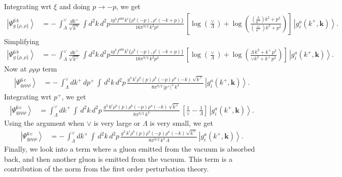 \documentclass[aps,prd,amsmath,amssymb,nofootinbib]{revtex4-2}
\numberwithin{equation}{section}
\begin{document}
Integrating wrt $\xi$ and doing $p\rightarrow -p$, we get
\begin{align}
    \left|\Psi_{g\,\{\rho,\rho\}}^{6\, b}\right\rangle & =-\,\int_{\Lambda}^{\vee} \frac{dk^{+}}{\sqrt{k^{+}}}\, \int d^{2}k \, d^{2}p \frac{ig^{3}f^{abc}k^{i}\{\rho^{b}(-p),\rho^{c}(-k+p)\}}{16\pi^{9/2}\,k^{2}p^{2}}\,\left[\log{\left(\frac{\vee}{\Lambda}\right)}+\log{\left(\frac{\left(\frac{\Lambda}{k^{+}}\right) k^{2}+p^{2}}{\left(\frac{\vee}{k^{+}} \right)k^{2}+p^{2}}\right)}\right]\,\left|g_{i}^{a}(k^{+},\mathbf{k})\right\rangle.
\end{align}
Simplifying
\begin{align}\label{tworhoafter}
    \left|\Psi_{g\,\{\rho,\rho\}}^{6\, b}\right\rangle & =-\,\int_{\Lambda}^{\vee} \frac{dk^{+}}{\sqrt{k^{+}}}\, \int d^{2}k \, d^{2}p \frac{ig^{3}f^{abc}k^{i}\{\rho^{b}(-p),\rho^{c}(-k+p)\}}{16\pi^{9/2}\,k^{2}p^{2}}\,\left[\log{\left(\frac{\vee}{\Lambda}\right)}+\log{\left(\frac{\Lambda\, k^{2} + k^{+}\,p^{2}}{\vee k^{2}+k^{+}\,p^{2}}\right)}\right]\,\left|g_{i}^{a}(k^{+},\mathbf{k})\right\rangle.
\end{align}
Now at $\rho\rho\rho$ term
\begin{align}
    \left|\Psi_{g\rho\rho\rho}^{6\, c}\right\rangle & = -\, \int_{\Lambda}^{\vee} dk^{+}\, dp^{+}\, \int\, d^{2}k\, d^{2}p\, \frac{g^{3}\, k^{i}\rho^{b}(p)\rho^{b}(-p)\rho^{a}(-k)\,\sqrt{k^{+}}}{8\pi^{9/2}\,|p^{+}|^{2}\,k^{4}}\,\left|g_{i}^{a}(k^{+},\mathbf{k})\right\rangle. 
\end{align}
Integrating wrt $p^{+}$, we get
\begin{align}
    \left|\Psi_{g\rho\rho\rho}^{6\, c}\right\rangle & = \int_{\Lambda}^{\vee} dk^{+}\, \int\, d^{2}k\, d^{2}p\, \frac{g^{3}\, k^{i}\rho^{b}(p)\rho^{b}(-p)\rho^{a}(-k)\,\sqrt{k^{+}}}{8\pi^{9/2}\,k^{4}}\, \left[\frac{1}{\vee}-\frac{1}{\Lambda}\right]\,\left|g_{i}^{a}(k^{+},\mathbf{k})\right\rangle.
\end{align}
Using the argument when $\vee$ is very large or $\Lambda$ is very small, we get
\begin{align}\label{threerhoafter}
        \left|\Psi_{g\rho\rho\rho}^{6\, c}\right\rangle & = -\,\int_{\Lambda}^{\vee} dk^{+}\, \int\, d^{2}k\, d^{2}p\, \frac{g^{3}\, k^{i}\rho^{b}(p)\rho^{b}(-p)\rho^{a}(-k)\,\sqrt{k^{+}}}{8\pi^{9/2}\,k^{4}\, \Lambda}\,\left|g_{i}^{a}(k^{+},\mathbf{k})\right\rangle.
\end{align}
Finally, we look into a term where a gluon emitted from the vacuum is absorbed back, and then another gluon is emitted from the vacuum. This term is a contribution of the norm from the first order perturbation theory.
\end{document}
